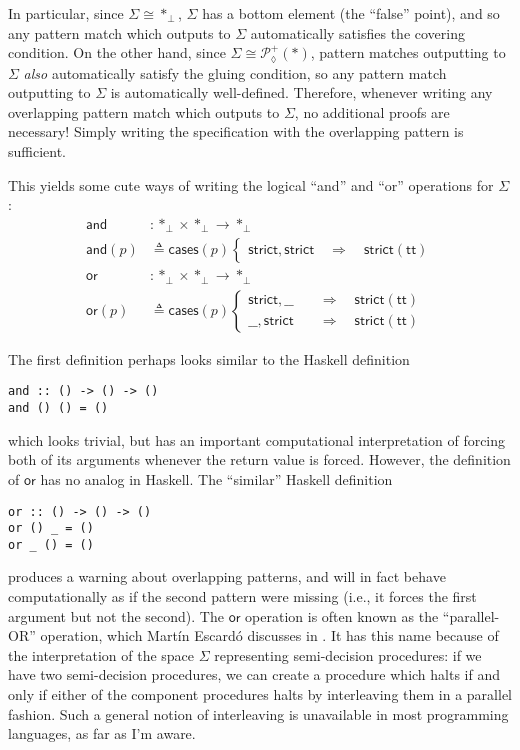 \documentclass[conference]{IEEEtran}
\newcommand{\PLower}{\mathcal{P}_\lozenge}
\newcommand{\One}{\ast}
\newcommand{\Branch}{\Rightarrow}
\begin{document}
In particular, since $\Sigma \cong \One_\bot$, $\Sigma$ has a bottom element (the ``false'' point), and so any pattern match which outputs to $\Sigma$ automatically satisfies the covering condition. On the other hand, since $\Sigma \cong \PLower^+(\One)$, pattern matches outputting to $\Sigma$ \emph{also} automatically satisfy the gluing condition, so any pattern match outputting to $\Sigma$ is automatically well-defined. Therefore, whenever writing any overlapping pattern match which outputs to $\Sigma$, no additional proofs are necessary! Simply writing the specification with the overlapping pattern is sufficient.

This yields some cute ways of writing the logical ``and'' and ``or'' operations for $\Sigma$:
\begin{align*}
\mathsf{and} &: \One_\bot \times \One_\bot \to \One_\bot
\\ \mathsf{and}(p) &\triangleq \mathsf{cases}(p)
\begin{cases}
\mathsf{strict} , \mathsf{strict}
  \quad \Branch \quad \mathsf{strict}(\mathsf{tt})
\end{cases}
\\
\mathsf{or} &: \One_\bot \times \One_\bot \to \One_\bot
\\ \mathsf{or}(p) &\triangleq \mathsf{cases}(p)
\begin{cases}
\mathsf{strict} , \_\_
  \quad &\Branch \quad \mathsf{strict}(\mathsf{tt})
\\  \_\_ , \mathsf{strict}
  \quad &\Branch \quad \mathsf{strict}(\mathsf{tt})
\end{cases}
\end{align*}

The first definition perhaps looks similar to the Haskell definition
\begin{verbatim}
and :: () -> () -> ()
and () () = ()
\end{verbatim}
which looks trivial, but has an important computational interpretation of forcing both of its arguments whenever the return value is forced. However, the definition of $\mathsf{or}$ has no analog in Haskell. The ``similar'' Haskell definition
\begin{verbatim}
or :: () -> () -> ()
or () _ = ()
or _ () = ()
\end{verbatim}
produces a warning about overlapping patterns, and will in fact behave computationally as if the second pattern were missing (i.e., it forces the first argument but not the second). The $\mathsf{or}$ operation is often known as the ``parallel-OR'' operation, which Mart\'in Escard\'o discusses in \cite{escardo2004}. It has this name because of the interpretation of the space $\Sigma$ representing semi-decision procedures: if we have two semi-decision procedures, we can create a procedure which halts if and only if either of the component procedures halts by interleaving them in a parallel fashion. Such a general notion of interleaving is unavailable in most programming languages, as far as I'm aware.
\end{document}
